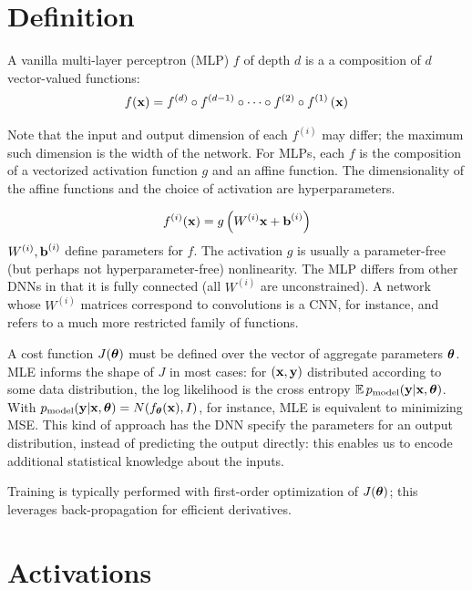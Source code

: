 \documentclass{article}
\begin{document}
\section{Definition}

A vanilla multi-layer perceptron (MLP) $f$ of depth $d$ is a a composition of $d$ vector-valued functions:
$$
f(\textbf{x})=f^{(d)}\circ f^{(d-1)}\circ\cdots\circ f^{(2)}\circ f^{(1)}\left({\textbf{x}}\right)
$$

Note that the input and output dimension of each $f^{(i)}$ may differ; the maximum such dimension is the width of the network. For MLPs, each $f$ is the composition of a vectorized activation function $g$ and an affine function. The dimensionality of the affine functions and the choice of activation are hyperparameters.

$$
f^{(i)}(\textbf{x})=g\left({W^{(i)}\textbf{x}+\textbf{b}^{(i)}}\right)
$$
$W^{(i)},\textbf{b}^{(i)}$ define parameters for $f$. The activation $g$ is usually a parameter-free (but perhaps not hyperparameter-free) nonlinearity. The MLP differs from other DNNs in that it is fully connected (all $W^{(i)}$ are unconstrained). A network whose $W^{(i)}$ matrices correspond to convolutions is a CNN, for instance, and refers to a much more restricted family of functions.

A cost function $J({\boldsymbol\theta})$ must be defined over the vector of aggregate parameters ${\boldsymbol\theta}$. MLE informs the shape of $J$ in most cases: for $(\textbf{x},\textbf{y})$ distributed according to some data distribution, the log likelihood is the cross entropy $\operatorname{\mathbb{E}} p_\text{model}(\textbf{y}|\textbf{x},{\boldsymbol\theta})$. With $p_\text{model}(\textbf{y}|\textbf{x},{\boldsymbol\theta})=N(f_{\boldsymbol\theta}(\textbf{x}),I)$, for instance, MLE is equivalent to minimizing MSE. This kind of approach has the DNN specify the parameters for an output distribution, instead of predicting the output directly: this enables us to encode additional statistical knowledge about the inputs.

Training is typically performed with first-order optimization of $J({\boldsymbol\theta})$; this leverages back-propagation for efficient derivatives.

\section{Activations}
\end{document}
